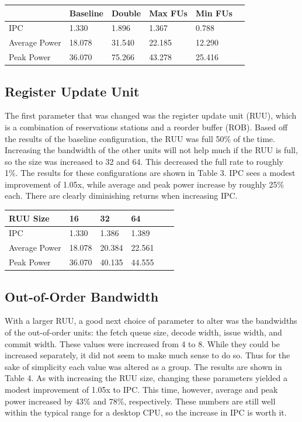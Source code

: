 \documentclass[english]{article}
\begin{document}
\begin{center}
	\vspace{.30cm}
	\begin{tabular}{ | l | l | l | l | l | l |}
		\hline
	  & Baseline & Double & Max FUs & Min FUs \\ \hline
      IPC & 1.330 & 1.896 & 1.367 & 0.788 \\ \hline
      Average Power & 18.078 & 31.540 & 22.185 & 12.290 \\ \hline
      Peak Power & 36.070 & 75.266 & 43.278 & 25.416 \\ \hline
	\end{tabular}
\end{center}

\subsection{Register Update Unit}
The first parameter that was changed was the register update unit (RUU), which is a combination of reservations stations and a reorder buffer (ROB). Based off the results of the baseline configuration, the RUU was full 50\% of the time. Increasing the bandwidth of the other units will not help much if the RUU is full, so the size was increased to 32 and 64. This decreased the full rate to roughly 1\%. The results for these configurations are shown in Table 3. IPC sees a modest improvement of 1.05x, while average and peak power increase by roughly 25\% each. There are clearly diminishing returns when increasing IPC.

\begin{center}
	\vspace{.30cm}
	\begin{tabular}{ | l | l | l | l | l | l |}
		\hline
	 RUU Size & 16 & 32 & 64 \\ \hline
     IPC & 1.330 & 1.386 & 1.389 \\ \hline
     Average Power & 18.078 & 20.384 & 22.561 \\ \hline
     Peak Power & 36.070 & 40.135 & 44.555 \\ \hline
	\end{tabular}
\end{center}

\subsection{Out-of-Order Bandwidth}
With a larger RUU, a good next choice of parameter to alter was the bandwidths of the out-of-order units: the fetch queue size, decode width, issue width, and commit width. These values were increased from 4 to 8. While they could be increased separately, it did not seem to make much sense to do so. Thus for the sake of simplicity each value was altered as a group. The results are shown in Table 4. As with increasing the RUU size, changing these parameters yielded a modest improvement of 1.05x to IPC. This time, however, average and peak power increased by 43\% and 78\%, respectively. These numbers are still well within the typical range for a desktop CPU, so the increase in IPC is worth it.
\end{document}
